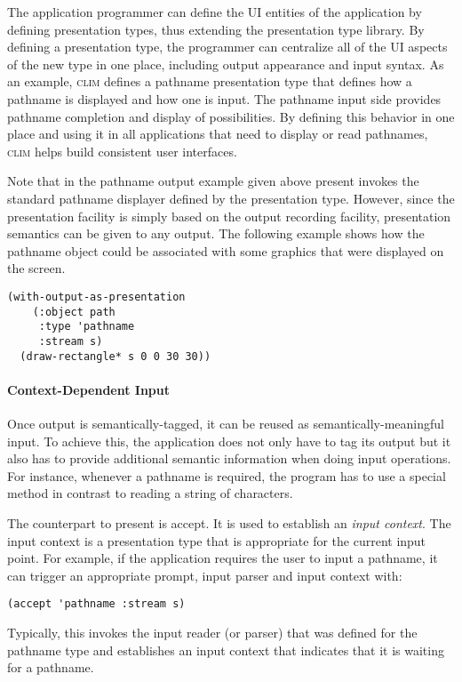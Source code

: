 \documentclass[twocolumn,a4paper]{article}
\newcommand {\concept} [1] {{\sl #1}\index{#1}}
\newcommand {\code}[1]{{\sffamily #1}}
\newcommand {\CLIM}{\textsc{clim}}
\let\method\code
\begin{document}
The application programmer can define the UI entities of the
application by defining presentation types, thus extending the
presentation type library. By defining a presentation type, the
programmer can centralize all of the UI aspects of the new type in one
place, including output appearance and input syntax. As an example,
\CLIM{} defines a pathname presentation type that defines how a
pathname is displayed and how one is input. The pathname input side
provides pathname completion and display of possibilities. By
defining this behavior in one place and using it in all applications
that need to display or read pathnames, \CLIM{} helps build consistent
user interfaces.

Note that in the pathname output example given above \method{present}
invokes the standard pathname displayer defined by the presentation
type. However, since the presentation facility is simply based on the
output recording facility, presentation semantics can be given to any
output. The following example shows how the pathname object could be
associated with some graphics that were displayed on the screen.

\begin{lstlisting}
(with-output-as-presentation 
    (:object path
     :type 'pathname 
     :stream s) 
  (draw-rectangle* s 0 0 30 30))
\end{lstlisting}

\paragraph*{Context-Dependent Input} Once output is
semantically-tagged, it can be reused as semantically-meaningful
input. To achieve this, the application does not only have to tag its
output but it also has to provide additional semantic information when
doing input operations. For instance, whenever a pathname is required,
the program has to use a special method in contrast to reading a
string of characters.

The counterpart to \method{present} is \method{accept}. It is used to
establish an \concept{input context}.  The input context is a
presentation type that is appropriate for the current input point. For
example, if the application requires the user to input a pathname, it
can trigger an appropriate prompt, input parser and input context
with:
\begin{lstlisting}
(accept 'pathname :stream s)
\end{lstlisting}
Typically, this invokes the input reader (or parser) that was defined
for the pathname type and establishes an input context that indicates
that it is waiting for a pathname.
\end{document}

